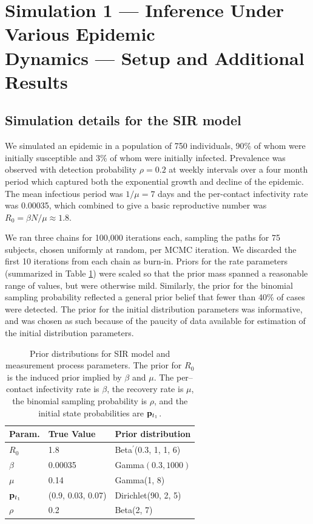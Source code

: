 \section{Simulation 1 --- Inference Under Various Epidemic\\ Dynamics --- Setup and Additional Results}
\label{sec:bda_sim1_details}
\subsection{Simulation details for the SIR model}
We simulated an epidemic in a population of 750 individuals, 90\% of whom were initially susceptible and 3\% of whom were initially infected. Prevalence was observed with detection probability $ \rho=0.2 $ at weekly intervals over a four month period which captured both the exponential growth and decline of the epidemic. The mean infectious period was $ 1/\mu = 7 $ days and the per-contact infectivity rate was 0.00035, which combined to give a basic reproductive number was $ R_0 = \beta N /\mu \approx 1.8$.

We ran three chains for 100,000 iterations each, sampling the paths for 75 subjects, chosen uniformly at random, per MCMC iteration. We discarded the first 10 iterations from each chain as burn-in. Priors for the rate parameters (summarized in Table \ref{tab:sim1_sir_priors}) were scaled so that the prior mass spanned a reasonable range of values, but were otherwise mild. Similarly, the prior for the binomial sampling probability reflected a general prior belief that fewer than 40\% of cases were detected. The prior for the initial distribution parameters was informative, and was chosen as such because of the paucity of data available for estimation of the initial distribution parameters.

\begin{table}[htbp]
	\centering
	\begin{tabular}{lll}
		\hline
		Param. & True Value & Prior distribution \\ 
		\hline
		$ R_0 $ & 1.8 & Beta$ ^\prime $(0.3, 1, 1, 6) \\
		$ \beta $ & 0.00035 & Gamma$ (0.3, 1000) $ \\ 
		$ \mu $ & 0.14 & Gamma(1, 8)  \\ 
		$ \mathbf{p}_{t_1} $ & (0.9, 0.03, 0.07) & Dirichlet(90, 2, 5)  \\ 
		$ \rho $ & 0.2 & Beta(2, 7) \\
		\hline
	\end{tabular}
	\caption[Simulation 1 priors for SIR model parameters.]{Prior distributions for SIR model and measurement process parameters. The prior for $ R_0 $ is the induced prior implied by $ \beta $ and $ \mu $. The per--contact infectivity rate is $ \beta $, the recovery rate is $ \mu $, the binomial sampling probability is $ \rho $, and the initial state probabilities are $ \mathbf{p}_{t_1} $.}
	\label{tab:sim1_sir_priors}
\end{table}

